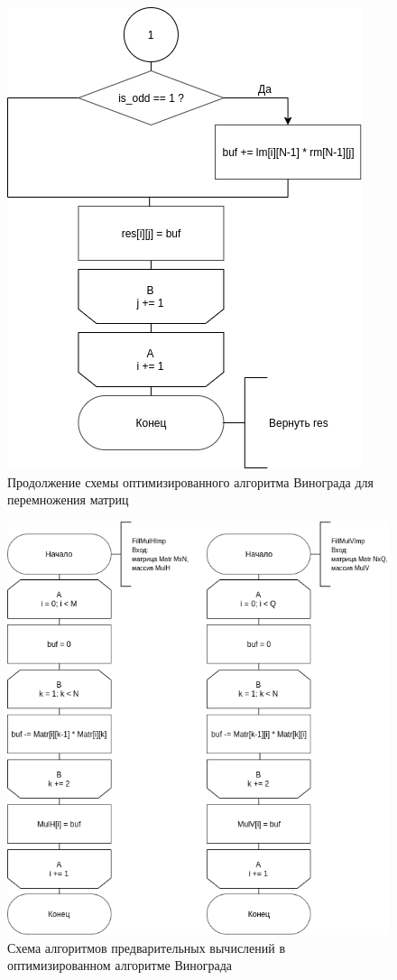 \begin{figure}[h]
	\centering
	\includegraphics{schemes/win-imp-bottom}
	\caption{Продолжение схемы оптимизированного алгоритма Винограда для перемножения матриц}
	\label{scheme:win-imp-bottom}
\end{figure}



\begin{figure}[h]
	\centering
	\includegraphics[scale=0.81]{schemes/fillmul-imp}
	\caption{Схема алгоритмов предварительных вычислений в оптимизированном алгоритме Винограда}
	\label{scheme:fillmul-imp}
\end{figure}


